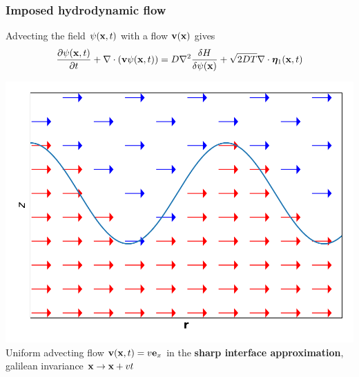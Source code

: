 \documentclass[9pt, dvipsnames]{beamer} %
\newcommand{\bx}{{\bf x}} %
\newcommand{\bv}{{\bf v}}
\begin{document}
\begin{frame}
    \frametitle{Imposed hydrodynamic flow}
    Advecting the field $\psi(\bx,t)$ with a flow $\bv(\bx)$ gives
    \begin{equation}
       \frac{\partial \psi(\bx,t)}{\partial t} + \nabla \cdot ( \bv \psi(\bx,t) ) = D\nabla^2\frac{\delta H}{\delta \psi(\bx)}+ \sqrt{2D T}\nabla \cdot {\bm \eta}_1(\bx,t) 
    \end{equation}

    \centering
    \includegraphics[scale=0.4]{driven.pdf}  \\
    Uniform advecting flow $\bv(\bx,t) = v {\bf e}_x$ in the {\bf sharp interface approximation}, galilean invariance $\bx \to \bx + v t$
\end{frame}
\end{document}
